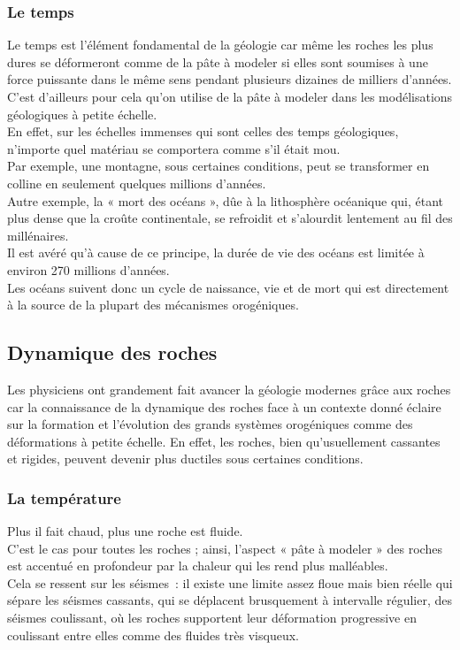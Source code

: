 \documentclass[a4paper,11pt]{article}
\begin{document}
\subsubsection{Le temps}

Le temps est l'élément fondamental de la géologie car même les roches les plus dures se déformeront comme de la pâte à modeler si elles sont soumises à une force puissante dans le même sens pendant plusieurs dizaines de milliers d'années. C'est d'ailleurs pour cela qu'on utilise de la pâte à modeler dans les modélisations géologiques à petite échelle.\\
En effet, sur les échelles immenses qui sont celles des temps géologiques, n'importe quel matériau se comportera comme s'il était mou.\\
Par exemple, une montagne, sous certaines conditions, peut se transformer en colline en seulement quelques millions d'années.\\
Autre exemple, la « mort des océans », dûe à la lithosphère océanique qui, étant plus dense que la croûte continentale, se refroidit et s'alourdit lentement au fil des millénaires.\\
Il est avéré qu'à cause de ce principe, la durée de vie des océans est limitée à environ 270 millions d'années.\\
Les océans suivent donc un cycle de naissance, vie et de mort qui est directement à la source de la plupart des mécanismes orogéniques. 

\subsection{Dynamique des roches}
	
Les physiciens ont grandement fait avancer la géologie modernes grâce aux roches car la connaissance de la dynamique des roches face à un contexte donné éclaire sur la formation et l'évolution des grands systèmes orogéniques comme des déformations à petite échelle.
En effet, les roches, bien qu'usuellement cassantes et rigides, peuvent devenir plus ductiles sous certaines conditions. \\

\subsubsection{La température}

Plus il fait chaud, plus une roche est fluide.\\
C'est le cas pour toutes les roches ; ainsi, l'aspect « pâte à modeler » des roches est accentué en profondeur par la chaleur qui les rend plus malléables.\\
Cela se ressent sur les séismes~: il existe une limite assez floue mais bien réelle qui sépare les séismes cassants, qui se déplacent brusquement à intervalle régulier, des séismes coulissant, où les roches supportent leur déformation progressive en coulissant entre elles comme des fluides très visqueux.
\end{document}
